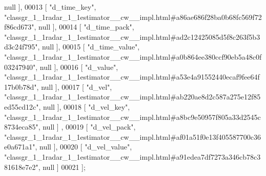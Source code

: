 \begin{DoxyCode}
      null ],
00013     [ \textcolor{stringliteral}{"d\_time\_key"}, \textcolor{stringliteral}{"classgr\_1\_1radar\_1\_1estimator\_\_cw\_\_impl.html#a86ae686f28ba0b68fc569f72f86cd673"}, null 
      ],
00014     [ \textcolor{stringliteral}{"d\_time\_pack"}, \textcolor{stringliteral}{"classgr\_1\_1radar\_1\_1estimator\_\_cw\_\_impl.html#ad2c12425085d5f8c263f5b3d3c24f795"}, null
       ],
00015     [ \textcolor{stringliteral}{"d\_time\_value"}, \textcolor{stringliteral}{"classgr\_1\_1radar\_1\_1estimator\_\_cw\_\_impl.html#a0b864ee380ccf90eb5a48c0f03247940"}, 
      null ],
00016     [ \textcolor{stringliteral}{"d\_value"}, \textcolor{stringliteral}{"classgr\_1\_1radar\_1\_1estimator\_\_cw\_\_impl.html#a53e4a91552440ecaf9fee64f17b0b78d"}, null ],
00017     [ \textcolor{stringliteral}{"d\_vel"}, \textcolor{stringliteral}{"classgr\_1\_1radar\_1\_1estimator\_\_cw\_\_impl.html#ab220ae8d2c587a275e12f85ed55cd12c"}, null ],
00018     [ \textcolor{stringliteral}{"d\_vel\_key"}, \textcolor{stringliteral}{"classgr\_1\_1radar\_1\_1estimator\_\_cw\_\_impl.html#a8bc9e50957f805a33d2545c8734eca85"}, null ]
      ,
00019     [ \textcolor{stringliteral}{"d\_vel\_pack"}, \textcolor{stringliteral}{"classgr\_1\_1radar\_1\_1estimator\_\_cw\_\_impl.html#af01a51f0e13f405587700c36e0a671a1"}, null 
      ],
00020     [ \textcolor{stringliteral}{"d\_vel\_value"}, \textcolor{stringliteral}{"classgr\_1\_1radar\_1\_1estimator\_\_cw\_\_impl.html#a91edea7df7273a346cb78c381618e7e2"}, null
       ]
00021 ];
\end{DoxyCode}
